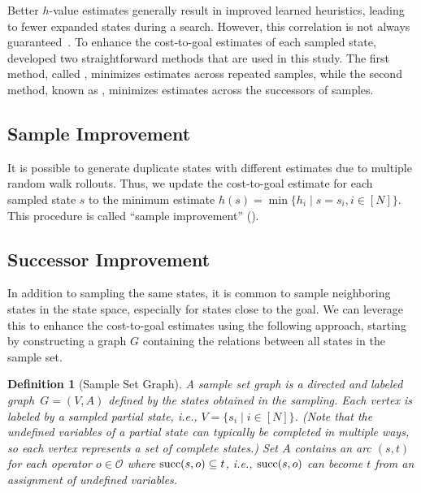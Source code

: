 \documentclass[ppgc,diss,english]{iiufrgs}
\newtheorem{definition}{Definition}
\begin{document}
Better $h$-value estimates generally result in improved learned heuristics, leading to fewer expanded states during a search. However, this correlation is not always guaranteed~\cite{Holte/2010}. To enhance the cost-to-goal estimates of each sampled state,~\citet{Bettker.etal/2022} developed two straightforward methods that are used in this study. The first method, called \sai, minimizes estimates across repeated samples, while the second method, known as \sui, minimizes estimates across the successors of samples.


\subsection{Sample Improvement}
\label{sec:sample-sai}
It is possible to generate duplicate states with different estimates due to multiple random walk rollouts. Thus, we update the cost-to-goal estimate for each sampled state $s$ to the minimum estimate $h(s) = \min\{h_i \mid s=s_i, i\in[N]\}$.
This procedure is called ``sample improvement'' (\sai).

\subsection{Successor Improvement}
\label{sec:sample-sui}
In addition to sampling the same states, it is common to sample neighboring states in the state space, especially for states close to the goal. We can leverage this to enhance the cost-to-goal estimates using the following approach, starting by constructing a graph $G$ containing the relations between all states in the sample set.
%
\begin{definition}[Sample Set Graph]\label{def:graph}
A sample set graph is a directed and labeled graph~$G = (V, A)$ defined by the states obtained in the sampling. Each vertex is labeled by a sampled partial state, i.e., $V = \{s_i \mid i \in [N]\}$. (Note that the undefined variables of a partial state can typically be completed in multiple ways, so each vertex represents a set of complete states.) Set $A$ contains an arc $(s,t)$ for each operator $o \in \mathcal{O}$ where $\operatorname{succ}(s,o) \subseteq t$, i.e., $\operatorname{succ}(s,o)$ can become $t$ from an assignment of undefined variables.
\end{definition}
\end{document}
